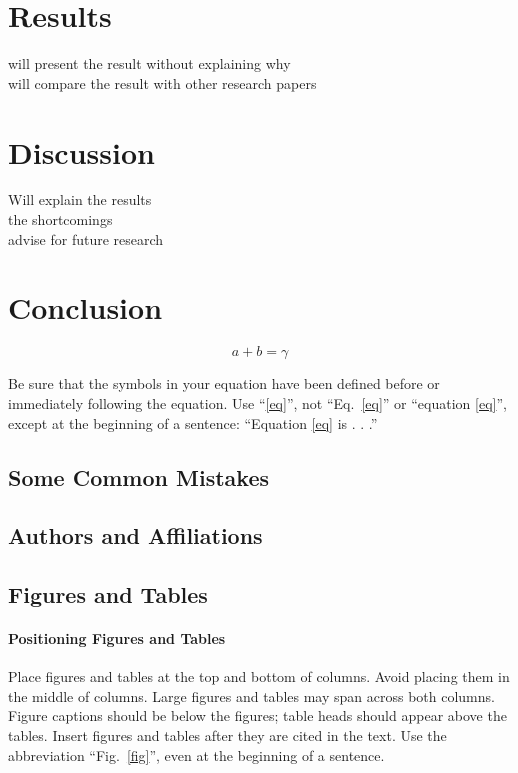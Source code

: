 \documentclass[conference]{IEEEtran}
\begin{document}
\section{Results}
will present the result without explaining why\\
will compare the result with other research papers\\

\section{Discussion}
Will explain the results\\
the shortcomings\\
advise for future research
\section{Conclusion}

\begin{equation}
a+b=\gamma\label{eq}
\end{equation}

Be sure that the 
symbols in your equation have been defined before or immediately following 
the equation. Use ``\eqref{eq}'', not ``Eq.~\eqref{eq}'' or ``equation \eqref{eq}'', except at 
the beginning of a sentence: ``Equation \eqref{eq} is . . .''

\subsection{Some Common Mistakes}\label{SCM}

\subsection{Authors and Affiliations}


\subsection{Figures and Tables}
\paragraph{Positioning Figures and Tables} Place figures and tables at the top and 
bottom of columns. Avoid placing them in the middle of columns. Large 
figures and tables may span across both columns. Figure captions should be 
below the figures; table heads should appear above the tables. Insert 
figures and tables after they are cited in the text. Use the abbreviation 
``Fig.~\ref{fig}'', even at the beginning of a sentence.
\end{document}
